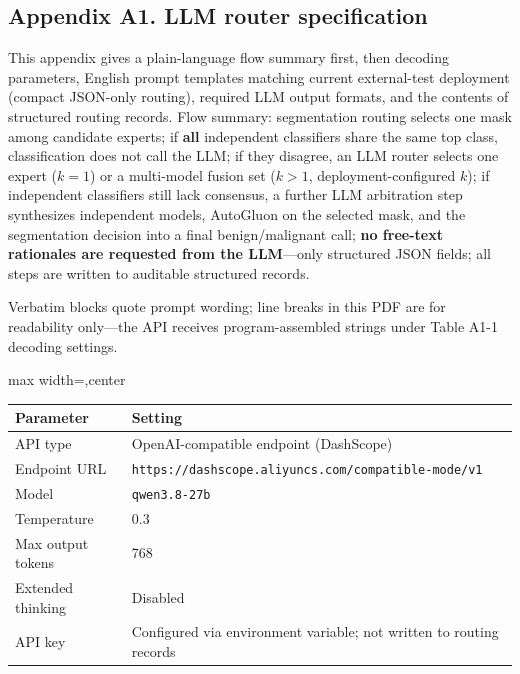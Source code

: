 \subsection*{Appendix A1. LLM router specification}
\label{app:A1}
\begin{responseappendixprose}
\noindent This appendix gives a plain-language flow summary first, then decoding parameters, English prompt templates matching current external-test deployment (compact JSON-only routing), required LLM output formats, and the contents of structured routing records. Flow summary: segmentation routing selects one mask among candidate experts; if \textbf{all} independent classifiers share the same top class, classification does not call the LLM; if they disagree, an LLM router selects one expert ($k{=}1$) or a multi-model fusion set ($k>1$, deployment-configured $k$); if independent classifiers still lack consensus, a further LLM arbitration step synthesizes independent models, AutoGluon on the selected mask, and the segmentation decision into a final benign/malignant call; \textbf{no free-text rationales are requested from the LLM}---only structured JSON fields; all steps are written to auditable structured records.
\par\noindent Verbatim blocks quote prompt wording; line breaks in this PDF are for readability only---the API receives program-assembled strings under Table A1-1 decoding settings.
\par
\begin{responseinlinetable}
\label{tab_A1_decode}
\begin{adjustbox}{max width=\textwidth,center}
\begin{tabular}{ll}
\toprule
Parameter & Setting \\
\midrule
API type & OpenAI-compatible endpoint (DashScope) \\
Endpoint URL & \texttt{https://dashscope.aliyuncs.com/compatible-mode/v1} \\
Model & \texttt{qwen3.8-27b} \\
Temperature & 0.3 \\
Max output tokens & 768 \\
Extended thinking & Disabled \\
API key & Configured via environment variable; not written to routing records \\
\bottomrule
\end{tabular}
\end{adjustbox}
\end{responseinlinetable}


\end{responseappendixprose}
